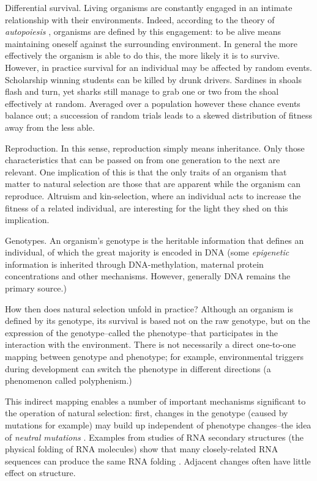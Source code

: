 Differential survival. Living organisms are constantly engaged in an intimate relationship with their environments. Indeed, according to the theory of \emph{autopoiesis} \parencite{Varela:1974qd}, organisms are defined by this engagement: to be alive means maintaining oneself against the surrounding environment. In general the more effectively the organism is able to do this, the more likely it is to survive. However, in practice survival for an individual may be affected by random events. Scholarship winning students can be killed by drunk drivers. Sardines in shoals flash and turn, yet sharks still manage to grab one or two from the shoal effectively at random. Averaged over a population however these chance events balance out; a succession of random trials leads to a skewed distribution of fitness away from the less able.

Reproduction. In this sense, reproduction simply means inheritance. Only those characteristics that can be passed on from one generation to the next are relevant. One implication of this is that the only traits of an organism that matter to natural selection are those that are apparent while the organism can reproduce. Altruism and kin-selection, where an individual acts to increase the fitness of a related individual, are interesting for the light they shed on this implication.

Genotypes. An organism's \gls{genotype} is the heritable information that defines an individual, of which the great majority is encoded in DNA (some \emph{epigenetic} information is inherited through DNA-methylation, maternal protein concentrations and other mechanisms. However, generally DNA remains the primary source.)

How then does natural selection unfold in practice? Although an organism is defined by its genotype, its survival is based not on the raw genotype, but on the expression of the genotype--called the \gls{phenotype}--that participates in the interaction with the environment. There is not necessarily a direct one-to-one mapping between genotype and phenotype; for example, environmental triggers
during development can switch the phenotype in different directions (a phenomenon called \gls{polyphenism}.)

This indirect mapping enables a number of important mechanisms significant to the operation of natural selection: first, changes in the genotype (caused by mutations for example) may build up independent of phenotype changes--the idea of \emph{neutral mutations} \parencite{Ohta:1996vn,Ohta:2002ys,Ohta:1973kx}. Examples from studies of RNA secondary structures (the physical folding of RNA molecules) show that many closely-related RNA sequences can produce the same RNA folding \parencite{Fontana:1993zn}. Adjacent changes often have little effect on structure.

